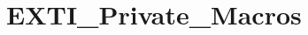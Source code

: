 \hypertarget{group___e_x_t_i___private___macros}{}\section{E\+X\+T\+I\+\_\+\+Private\+\_\+\+Macros}
\label{group___e_x_t_i___private___macros}
